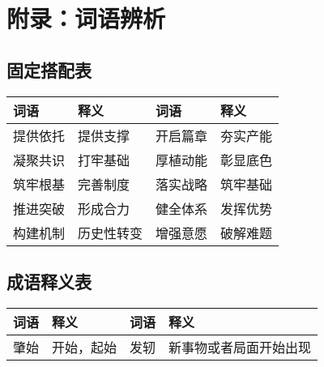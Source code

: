 \section{附录：词语辨析}
\label{sec:appendix}

\subsection{固定搭配表}

\begin{longtable}{|p{}|p{}|p{}|p{}|}
    \hline
    \textbf{词语} & \textbf{释义} & \textbf
    {词语}        & \textbf{释义}                  \\
    \hline
    提供依托        & 提供支撑        & 开启篇章    & 夯实产能 \\
    \hline
    凝聚共识        & 打牢基础        & 厚植动能    & 彰显底色 \\
    \hline
    筑牢根基        & 完善制度        & 落实战略    & 筑牢基础 \\
    \hline
    推进突破        & 形成合力        & 健全体系    & 发挥优势 \\
    \hline
    构建机制        & 历史性转变       & 增强意愿    & 破解难题 \\
    \hline
\end{longtable}

\subsection{成语释义表}

\begin{longtable}{|p{}|p{}|p{}|p{}|}
    \hline
    \textbf{词语} & \textbf{释义} & \textbf
    {词语}        & \textbf{释义}                         \\
    \hline
    肇始          & 开始，起始       & 发轫      & 新事物或者局面开始出现 \\

    \hline
\end{longtable}